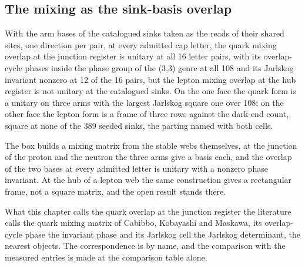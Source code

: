 \subsection{The mixing as the sink-basis overlap}\label{mod:VI-7-D536241-w-mxso}
\begin{chwall}\label{box:VI-7-D536241-w-mxso:1}
With the arm bases of the catalogued sinks taken as the reads of their shared sites, one direction per pair, at every admitted cap letter, the quark mixing overlap at the junction register is unitary at all 16 letter pairs, with its overlap-cycle phases inside the phase group of the (3,3) genre at all 108 and its Jarlskog invariant nonzero at 12 of the 16 pairs, but the lepton mixing overlap at the hub register is not unitary at the catalogued sinks. On the one face the quark form is a unitary on three arms with the largest Jarlskog square one over 108; on the other face the lepton form is a frame of three rows against the dark-end count, square at none of the 389 seeded sinks, the parting named with both cells.
\end{chwall}
The box builds a mixing matrix from the stable webs themselves, at the junction of the proton and the neutron the three arms give a basis each, and the overlap of the two bases at every admitted letter is unitary with a nonzero phase invariant. At the hub of a lepton web the same construction gives a rectangular frame, not a square matrix, and the open result stands there.
\begin{chbridge}
What this chapter calls the quark overlap at the junction register the literature calls the quark mixing matrix of Cabibbo, Kobayashi and Maskawa, its overlap-cycle phase the invariant phase and its Jarlskog cell the Jarlskog determinant, the nearest objects. The correspondence is by name, and the comparison with the measured entries is made at the comparison table alone.
\end{chbridge}
